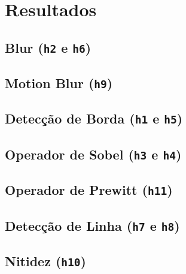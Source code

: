 \section{Resultados} \label{sec:resultado}

\subsection{Blur (\texttt{h2} e \texttt{h6})} \label{sec:blur}

    

\subsection{Motion Blur (\texttt{h9})} \label{sec:motion}

    

\subsection{Detecção de Borda (\texttt{h1} e \texttt{h5})} \label{sec:borda}

    

\subsection{Operador de Sobel (\texttt{h3} e \texttt{h4})} \label{sec:sobel}

    

\subsection{Operador de Prewitt (\texttt{h11})} \label{sec:grad}

    

\subsection{Detecção de Linha (\texttt{h7} e \texttt{h8})} \label{sec:linha}

    

\subsection{Nitidez (\texttt{h10})} \label{sec:sharpen}

    

